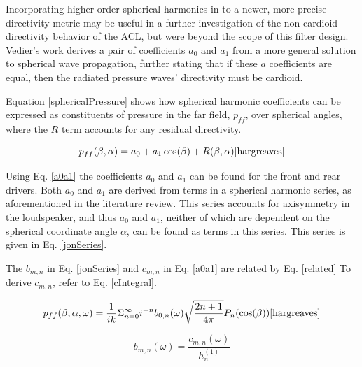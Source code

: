 \documentclass{report}
\begin{document}
            Incorporating higher order spherical harmonics in to a newer, more precise directivity metric may be useful in a further investigation of the non-cardioid directivity behavior of the ACL, but were beyond the scope of this filter design.
            Vedier's work derives a pair of coefficients $a_0$ and $a_1$ from a more general solution to spherical wave propagation, further stating that if these $a$ coefficients are equal, then the radiated pressure waves' directivity must be cardioid.

            Equation \ref{sphericalPressure} shows how spherical harmonic coefficients can be expressed as constituents of pressure in the far field, $p_{ff}$, over spherical angles, where the $R$ term accounts for any residual directivity.

            \begin{equation}
                p_{ff}(\beta,\alpha) = a_0 + a_1 \cos(\beta) + R(\beta,\alpha)
                \label{sphericalPressure}
                \cite{hargreaves}
            \end{equation}

            Using Eq. \ref{a0a1} the coefficients $a_0$ and $a_1$ can be found for the front and rear drivers.
            Both $a_0$ and $a_1$ are derived from terms in a spherical harmonic series, as aforementioned in the literature review.
            This series accounts for axisymmetry in the loudspeaker, and thus $a_0$ and $a_1$, neither of which are dependent on the spherical coordinate angle $\alpha$, can be found as terms in this series.
            This series is given in Eq. \ref{jonSeries}.

            The $b_{m,n}$ in Eq. \ref{jonSeries} and $c_{m,n}$ in Eq. \ref{a0a1} are related by Eq. \ref{related}
            To derive $c_{m,n}$, refer to Eq. \ref{cIntegral}.
            
            \begin{equation}
                p_{ff}(\beta,\alpha,\omega) = \frac{1}{ik} \Sigma_{n=0}^{\infty}i^{-n}b_{0,n}(\omega)\sqrt{\frac{2n+1}{4\pi}}P_n(\cos(\beta))
                \label{jonSeries}
                \cite{hargreaves}
            \end{equation}

            \begin{equation}
                b_{m,n}(\omega) = \frac{c_{m,n}(\omega)}{h_n^{(1)}}
                \label{related}
            \end{equation}
\end{document}
